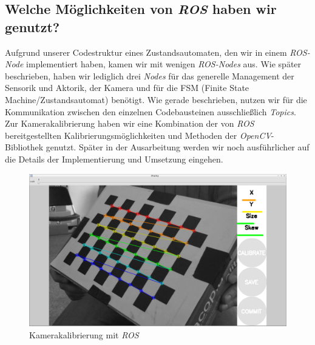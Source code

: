 \subsection{Welche Möglichkeiten von \textit{ROS} haben wir genutzt?}
Aufgrund unserer Codestruktur eines Zustandsautomaten, den wir in einem \textit{ROS-Node} implementiert haben, kamen wir mit wenigen \textit{ROS-Nodes} aus. Wie später beschrieben, haben wir lediglich drei \textit{Nodes} für das generelle Management der Sensorik und Aktorik, der Kamera und für die FSM (Finite State Machine/Zustandsautomat) benötigt. Wie gerade beschrieben, nutzen wir für die Kommunikation zwischen den einzelnen Codebausteinen ausschließlich \textit{Topics}.
Zur Kamerakalibrierung haben wir eine Kombination der von \textit{ROS} bereitgestellten Kalibrierungsmöglichkeiten und Methoden der \textit{OpenCV}-Bibliothek genutzt. Später in der Ausarbeitung werden wir noch ausführlicher auf die Details der Implementierung und Umsetzung eingehen.

\begin{figure}[htbp] 
	\centering
	\includegraphics[width=\textwidth]{images/schachbrett.png}
	\caption{Kamerakalibrierung mit \textit{ROS}}
	\label{fig:CamKalib}
\end{figure}